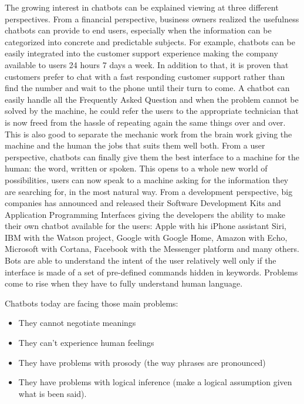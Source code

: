 \documentclass[b5paper,10pt,twoside,cucitura]{toptesi}
\begin{document}
The growing interest in chatbots can be explained viewing at three different perspectives.
From a financial perspective, business owners realized the usefulness chatbots can provide to end users, especially when the information can be categorized into concrete and predictable subjects. For example, chatbots can be easily integrated into the customer support experience making the company available to users 24 hours 7 days a week. In addition to that, it is proven that customers prefer to chat with a fast responding customer support rather than find the number and wait to the phone until their turn to come. A chatbot can easily handle all the Frequently Asked Question and when the problem cannot be solved by the machine, he could refer the users to the appropriate technician that is now freed from the hassle of repeating again the same things over and over. This is also good to separate the mechanic work from the brain work giving the machine and the human the jobs that suits them well both. From a user perspective, chatbots can finally give them the best interface to a machine for the human: the word, written or spoken. This opens to a whole new world of possibilities, users can now speak to a machine asking for the information they are searching for, in the most natural way.
From a development perspective, big companies has announced and released their Software Development Kits and Application Programming Interfaces giving the developers the ability to make their own chatbot available for the users: Apple with his iPhone assistant Siri, IBM with the Watson project, Google with Google Home, Amazon with Echo, Microsoft with Cortana, Facebook with the Messenger platform and many others.
Bots are able to understand the intent of the user relatively well only if the interface is made of a set of pre-defined commands hidden in keywords. Problems come to rise when they have to fully understand human language. 

Chatbots today are facing those main problems:

\begin{itemize}
\item They cannot negotiate meanings
\item They can't experience human feelings
\item They have problems with prosody (the way phrases are pronounced)
\item They have problems with logical inference (make a logical assumption given what is been said).
\end{itemize}
\end{document}
